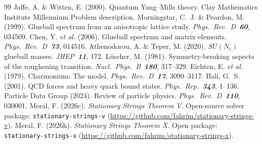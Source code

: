 \documentclass[12pt,a4paper]{article}
\begin{document}
\begin{thebibliography}{99}
     Jaffe, A. \& Witten, E. (2000). Quantum Yang--Mills theory.
    Clay Mathematics Institute Millennium Problem description.
     Morningstar, C.~J. \& Peardon, M. (1999). Glueball spectrum
    from an anisotropic lattice study. \textit{Phys.\ Rev.\ D\ \textbf{60}}, 034509.
     Chen, Y. \textit{et al.} (2006). Glueball spectrum and matrix
    elements. \textit{Phys.\ Rev.\ D\ \textbf{73}}, 014516.
     Athenodorou, A. \& Teper, M. (2020). $SU(N_c)$ glueball masses.
    \textit{JHEP\ \textbf{11}}, 172.
     L\"uscher, M. (1981). Symmetry-breaking aspects of the roughening
    transition. \textit{Nucl.\ Phys.\ B\ \textbf{180}}, 317--329.
     Eichten, E. \textit{et al.} (1979). Charmonium: The model.
    \textit{Phys.\ Rev.\ D\ \textbf{17}}, 3090--3117.
     Bali, G.~S. (2001). QCD forces and heavy quark bound states.
    \textit{Phys.\ Rep.\ \textbf{343}}, 1--136.
     Particle Data Group (2024). Review of particle physics.
    \textit{Phys.\ Rev.\ D\ \textbf{110}}, 030001.
     Meral, F. (2026c). \textit{Stationary Strings Theorem V}.
    Open-source solver package: \texttt{stationary-strings-v}
    (\url{https://github.com/fahrim/stationary-strings-v}).
     Meral, F. (2026h). \textit{Stationary Strings Theorem X}.
    Open package: \texttt{stationary-strings-x}
    (\url{https://github.com/fahrim/stationary-strings-x}).
\end{thebibliography}
\end{document}
